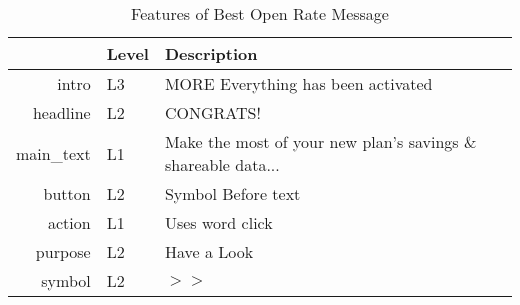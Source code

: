 \begin{table}[ht]
\centering
\caption{Features of Best Open Rate Message} 
\label{tab:best_open}
\begin{tabular}{rll}
  \hline
 & Level & Description \\ 
  \hline
intro & L3 & MORE Everything has been activated \\ 
  headline & L2 & CONGRATS! \\ 
  main\_text & L1 & Make the most of your new plan’s savings \& shareable data... \\ 
  button & L2 & Symbol Before text \\ 
  action & L1 & Uses word click \\ 
  purpose & L2 & Have a Look \\ 
  symbol & L2 & $>>$ \\ 
   \hline
\end{tabular}
\end{table}
